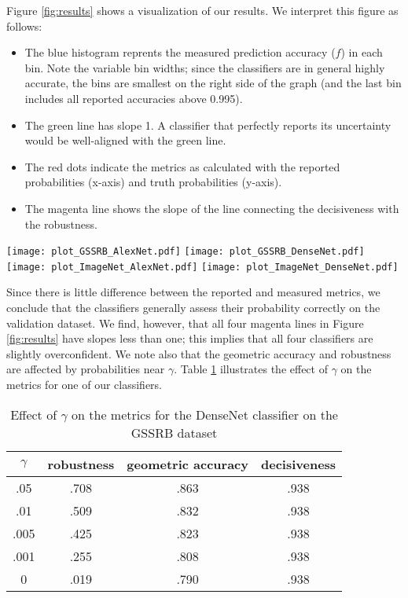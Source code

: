 \documentclass{spie}
\begin{document}
Figure \ref{fig:results} shows a visualization of our results. We interpret this figure as follows:
\begin{itemize}
\item The blue histogram reprents the measured prediction accuracy ($f$) in each bin. Note the variable bin widths; since the classifiers are in general highly accurate, the bins are smallest on the right side of the graph (and the last bin includes all reported accuracies above 0.995). 
\item The green line has slope 1. A classifier that perfectly reports its uncertainty would be well-aligned with the green line. 
\item The red dots indicate the metrics as calculated with the reported probabilities (x-axis) and truth probabilities (y-axis). 
\item The magenta line shows the slope of the line connecting the decisiveness with the robustness. 
\end{itemize}

\begin{figure*}[!h]
  \texttt{[image: plot\_GSSRB\_AlexNet.pdf]}
  \texttt{[image: plot\_GSSRB\_DenseNet.pdf]}
  \texttt{[image: plot\_ImageNet\_AlexNet.pdf]}
  \texttt{[image: plot\_ImageNet\_DenseNet.pdf]}
  \centering
  \caption{Illustration of Reported Accuracy vs. Measured Accuracy for two datasets and two classifiers (as indicated). Note the variable-width bins. The green line reflects perfect alignment between reported and measured accuracy, while the red dots (from left to right) show the (reported, truth) values for the robustness, geometric accuracy, and decisiveness, respectively.}
  \label{fig:results}
\end{figure*}

Since there is little difference between the reported and measured metrics, we conclude that the classifiers generally assess their probability correctly on the validation dataset. We find, however, that all four magenta lines in Figure \ref{fig:results} have slopes less than one; this implies that all four classifiers are slightly overconfident. We note also that the geometric accuracy and robustness are affected by probabilities near $\gamma$. Table \ref{tab:gamma} illustrates the effect of $\gamma$ on the metrics for one of our classifiers. 

\begin{table}[h]
\centering
\caption{Effect of $\gamma$ on the metrics for the DenseNet classifier on the GSSRB dataset}
\vspace{0.05in}
\label{tab:gamma}
\begin{tabular}{|c|c|c|c|}
\hline
$\gamma$ & robustness & geometric accuracy & decisiveness \\
\hline
.05 & .708 & .863 & .938 \\
\hline
.01 & .509 & .832 & .938 \\
\hline
.005 & .425 & .823 & .938 \\
\hline
.001 & .255 & .808 & .938 \\
\hline
0 & .019 & .790 & .938 \\
\hline
\end{tabular}
\end{table}
\end{document}
